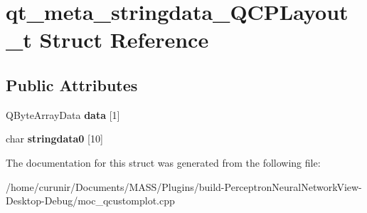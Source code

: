 \hypertarget{structqt__meta__stringdata___q_c_p_layout__t}{}\section{qt\+\_\+meta\+\_\+stringdata\+\_\+\+Q\+C\+P\+Layout\+\_\+t Struct Reference}
\label{structqt__meta__stringdata___q_c_p_layout__t}
\subsection*{Public Attributes}
\begin{DoxyCompactItemize}
\item 
Q\+Byte\+Array\+Data {\bfseries data} \mbox{[}1\mbox{]}\hypertarget{structqt__meta__stringdata___q_c_p_layout__t_a133fdcad1faf8247b373a50c8dcb604f}{}\label{structqt__meta__stringdata___q_c_p_layout__t_a133fdcad1faf8247b373a50c8dcb604f}

\item 
char {\bfseries stringdata0} \mbox{[}10\mbox{]}\hypertarget{structqt__meta__stringdata___q_c_p_layout__t_ad487cc776f3a79ee6a9f10c234b3ade0}{}\label{structqt__meta__stringdata___q_c_p_layout__t_ad487cc776f3a79ee6a9f10c234b3ade0}

\end{DoxyCompactItemize}


The documentation for this struct was generated from the following file\+:\begin{DoxyCompactItemize}
\item 
/home/curunir/\+Documents/\+M\+A\+S\+S/\+Plugins/build-\/\+Perceptron\+Neural\+Network\+View-\/\+Desktop-\/\+Debug/moc\+\_\+qcustomplot.\+cpp\end{DoxyCompactItemize}

